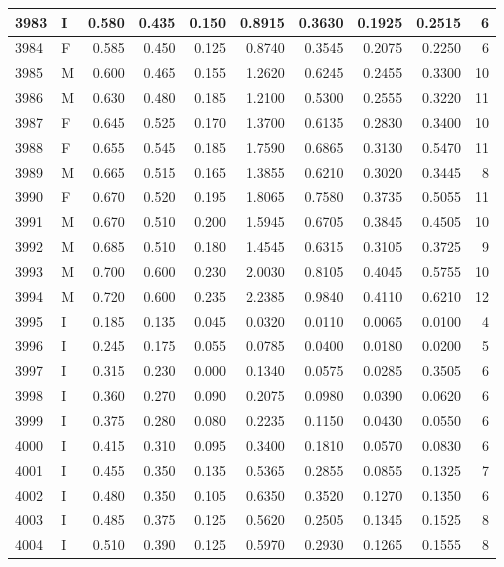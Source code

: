 \documentclass[9pt,twocolumn,twoside,]{pnas-new}
\begin{document}
\begin{tabular}{l|l|r|r|r|r|r|r|r|r}
\hline
3983 & I & 0.580 & 0.435 & 0.150 & 0.8915 & 0.3630 & 0.1925 & 0.2515 & 6\\
\hline
3984 & F & 0.585 & 0.450 & 0.125 & 0.8740 & 0.3545 & 0.2075 & 0.2250 & 6\\
\hline
3985 & M & 0.600 & 0.465 & 0.155 & 1.2620 & 0.6245 & 0.2455 & 0.3300 & 10\\
\hline
3986 & M & 0.630 & 0.480 & 0.185 & 1.2100 & 0.5300 & 0.2555 & 0.3220 & 11\\
\hline
3987 & F & 0.645 & 0.525 & 0.170 & 1.3700 & 0.6135 & 0.2830 & 0.3400 & 10\\
\hline
3988 & F & 0.655 & 0.545 & 0.185 & 1.7590 & 0.6865 & 0.3130 & 0.5470 & 11\\
\hline
3989 & M & 0.665 & 0.515 & 0.165 & 1.3855 & 0.6210 & 0.3020 & 0.3445 & 8\\
\hline
3990 & F & 0.670 & 0.520 & 0.195 & 1.8065 & 0.7580 & 0.3735 & 0.5055 & 11\\
\hline
3991 & M & 0.670 & 0.510 & 0.200 & 1.5945 & 0.6705 & 0.3845 & 0.4505 & 10\\
\hline
3992 & M & 0.685 & 0.510 & 0.180 & 1.4545 & 0.6315 & 0.3105 & 0.3725 & 9\\
\hline
3993 & M & 0.700 & 0.600 & 0.230 & 2.0030 & 0.8105 & 0.4045 & 0.5755 & 10\\
\hline
3994 & M & 0.720 & 0.600 & 0.235 & 2.2385 & 0.9840 & 0.4110 & 0.6210 & 12\\
\hline
3995 & I & 0.185 & 0.135 & 0.045 & 0.0320 & 0.0110 & 0.0065 & 0.0100 & 4\\
\hline
3996 & I & 0.245 & 0.175 & 0.055 & 0.0785 & 0.0400 & 0.0180 & 0.0200 & 5\\
\hline
3997 & I & 0.315 & 0.230 & 0.000 & 0.1340 & 0.0575 & 0.0285 & 0.3505 & 6\\
\hline
3998 & I & 0.360 & 0.270 & 0.090 & 0.2075 & 0.0980 & 0.0390 & 0.0620 & 6\\
\hline
3999 & I & 0.375 & 0.280 & 0.080 & 0.2235 & 0.1150 & 0.0430 & 0.0550 & 6\\
\hline
4000 & I & 0.415 & 0.310 & 0.095 & 0.3400 & 0.1810 & 0.0570 & 0.0830 & 6\\
\hline
4001 & I & 0.455 & 0.350 & 0.135 & 0.5365 & 0.2855 & 0.0855 & 0.1325 & 7\\
\hline
4002 & I & 0.480 & 0.350 & 0.105 & 0.6350 & 0.3520 & 0.1270 & 0.1350 & 6\\
\hline
4003 & I & 0.485 & 0.375 & 0.125 & 0.5620 & 0.2505 & 0.1345 & 0.1525 & 8\\
\hline
4004 & I & 0.510 & 0.390 & 0.125 & 0.5970 & 0.2930 & 0.1265 & 0.1555 & 8\\

\end{tabular}
\end{document}

